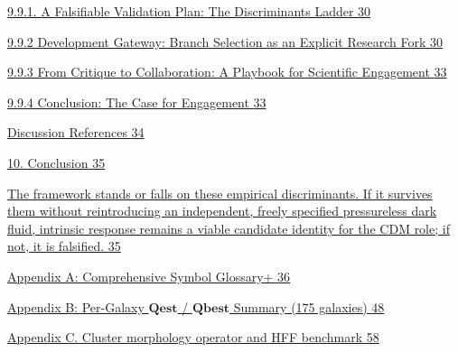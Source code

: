 \hyperref[a-falsifiable-validation-plan-the-discriminants-ladder]{9.9.1. A Falsifiable Validation Plan: The Discriminants Ladder \hyperref[a-falsifiable-validation-plan-the-discriminants-ladder]{30}}

\hyperref[development-gateway-branch-selection-as-an-explicit-research-fork]{9.9.2 Development Gateway: Branch Selection as an Explicit Research Fork \hyperref[development-gateway-branch-selection-as-an-explicit-research-fork]{30}}

\hyperref[from-critique-to-collaboration-a-playbook-for-scientific-engagement]{9.9.3 From Critique to Collaboration: A Playbook for Scientific Engagement \hyperref[from-critique-to-collaboration-a-playbook-for-scientific-engagement]{33}}

\hyperref[conclusion-the-case-for-engagement]{9.9.4 Conclusion: The Case for Engagement \hyperref[conclusion-the-case-for-engagement]{33}}

\hyperref[discussion-references]{Discussion References \hyperref[discussion-references]{34}}

\hyperref[conclusion]{10. Conclusion \hyperref[conclusion]{35}}

\hyperref[the-framework-stands-or-falls-on-these-empirical-discriminants.-if-it-survives-them-without-reintroducing-an-independent-freely-specified-pressureless-dark-fluid-intrinsic-response-remains-a-viable-candidate-identity-for-the-cdm-role-if-not-it-is-falsified.]{The framework stands or falls on these empirical discriminants. If it survives them without reintroducing an independent, freely specified pressureless dark fluid, intrinsic response remains a viable candidate identity for the CDM role; if not, it is falsified. \hyperref[the-framework-stands-or-falls-on-these-empirical-discriminants.-if-it-survives-them-without-reintroducing-an-independent-freely-specified-pressureless-dark-fluid-intrinsic-response-remains-a-viable-candidate-identity-for-the-cdm-role-if-not-it-is-falsified.]{35}}

\hyperref[appendix-a-comprehensive-symbol-glossary]{Appendix A: Comprehensive Symbol Glossary+ \hyperref[appendix-a-comprehensive-symbol-glossary]{36}}

\hyperref[appendix-b-per-galaxy-mathbfq_mathbfest-mathbfq_mathbfbest-summary-175-galaxies]{Appendix B: Per-Galaxy \(\mathbf{Qest}\) / \(\mathbf{Qbest}\) Summary (175 galaxies) \hyperref[appendix-b-per-galaxy-mathbfq_mathbfest-mathbfq_mathbfbest-summary-175-galaxies]{48}}

\hyperref[appendix-c.-cluster-morphology-operator-and-hff-benchmark]{Appendix C. Cluster morphology operator and HFF benchmark \hyperref[appendix-c.-cluster-morphology-operator-and-hff-benchmark]{58}}


